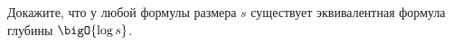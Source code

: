 Докажите, что у любой формулы размера $s$ существует эквивалентная формула глубины $\bigO{\log s}$.
